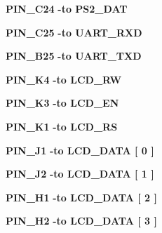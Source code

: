 \begin{DoxyCompactItemize}
\item 
{\bf P\+I\+N\+\_\+\+C24} {\bfseries \textcolor{vhdlchar}{-\/}\textcolor{keywordflow}{to}\textcolor{vhdlchar}{ }\textcolor{vhdlchar}{P\+S2\+\_\+\+D\+AT}\textcolor{vhdlchar}{ }} 
\item 
{\bf P\+I\+N\+\_\+\+C25} {\bfseries \textcolor{vhdlchar}{-\/}\textcolor{keywordflow}{to}\textcolor{vhdlchar}{ }\textcolor{vhdlchar}{U\+A\+R\+T\+\_\+\+R\+XD}\textcolor{vhdlchar}{ }} 
\item 
{\bf P\+I\+N\+\_\+\+B25} {\bfseries \textcolor{vhdlchar}{-\/}\textcolor{keywordflow}{to}\textcolor{vhdlchar}{ }\textcolor{vhdlchar}{U\+A\+R\+T\+\_\+\+T\+XD}\textcolor{vhdlchar}{ }} 
\item 
{\bf P\+I\+N\+\_\+\+K4} {\bfseries \textcolor{vhdlchar}{-\/}\textcolor{keywordflow}{to}\textcolor{vhdlchar}{ }\textcolor{vhdlchar}{L\+C\+D\+\_\+\+RW}\textcolor{vhdlchar}{ }} 
\item 
{\bf P\+I\+N\+\_\+\+K3} {\bfseries \textcolor{vhdlchar}{-\/}\textcolor{keywordflow}{to}\textcolor{vhdlchar}{ }\textcolor{vhdlchar}{L\+C\+D\+\_\+\+EN}\textcolor{vhdlchar}{ }} 
\item 
{\bf P\+I\+N\+\_\+\+K1} {\bfseries \textcolor{vhdlchar}{-\/}\textcolor{keywordflow}{to}\textcolor{vhdlchar}{ }\textcolor{vhdlchar}{L\+C\+D\+\_\+\+RS}\textcolor{vhdlchar}{ }} 
\item 
{\bf P\+I\+N\+\_\+\+J1} {\bfseries \textcolor{vhdlchar}{-\/}\textcolor{keywordflow}{to}\textcolor{vhdlchar}{ }\textcolor{vhdlchar}{L\+C\+D\+\_\+\+D\+A\+TA}\textcolor{vhdlchar}{ }\textcolor{vhdlchar}{[}\textcolor{vhdlchar}{ } \textcolor{vhdldigit}{0} \textcolor{vhdlchar}{ }\textcolor{vhdlchar}{]}\textcolor{vhdlchar}{ }} 
\item 
{\bf P\+I\+N\+\_\+\+J2} {\bfseries \textcolor{vhdlchar}{-\/}\textcolor{keywordflow}{to}\textcolor{vhdlchar}{ }\textcolor{vhdlchar}{L\+C\+D\+\_\+\+D\+A\+TA}\textcolor{vhdlchar}{ }\textcolor{vhdlchar}{[}\textcolor{vhdlchar}{ } \textcolor{vhdldigit}{1} \textcolor{vhdlchar}{ }\textcolor{vhdlchar}{]}\textcolor{vhdlchar}{ }} 
\item 
{\bf P\+I\+N\+\_\+\+H1} {\bfseries \textcolor{vhdlchar}{-\/}\textcolor{keywordflow}{to}\textcolor{vhdlchar}{ }\textcolor{vhdlchar}{L\+C\+D\+\_\+\+D\+A\+TA}\textcolor{vhdlchar}{ }\textcolor{vhdlchar}{[}\textcolor{vhdlchar}{ } \textcolor{vhdldigit}{2} \textcolor{vhdlchar}{ }\textcolor{vhdlchar}{]}\textcolor{vhdlchar}{ }} 
\item 
{\bf P\+I\+N\+\_\+\+H2} {\bfseries \textcolor{vhdlchar}{-\/}\textcolor{keywordflow}{to}\textcolor{vhdlchar}{ }\textcolor{vhdlchar}{L\+C\+D\+\_\+\+D\+A\+TA}\textcolor{vhdlchar}{ }\textcolor{vhdlchar}{[}\textcolor{vhdlchar}{ } \textcolor{vhdldigit}{3} \textcolor{vhdlchar}{ }\textcolor{vhdlchar}{]}\textcolor{vhdlchar}{ }} 

\end{DoxyCompactItemize}
